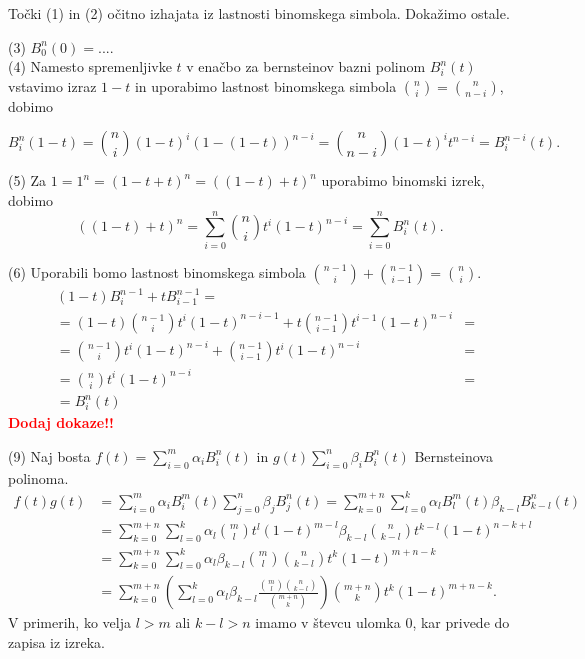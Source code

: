 \documentclass[isrm2, tisk]{fmfdelo}
\newcommand{\bernstein}[2]{\binom{#1}{#2}t^{#2}(1-t)^{#1-#2}}
\newcommand{\mycomment}[1]{\textbf{\textcolor{red}{#1}}}
\begin{document}
    \begin{dokaz}
        Točki (1) in (2) očitno izhajata iz lastnosti binomskega simbola.
        Dokažimo ostale.

        \noindent(3) $B_0^n(0) = ....$\\
        \noindent(4) Namesto spremenljivke $t$ v enačbo za bernsteinov bazni polinom $B_i^n(t)$ vstavimo izraz $1-t$ in uporabimo lastnost binomskega simbola $\binom{n}{i} = \binom{n}{n-i}$, dobimo

        \[B_i^n(1-t) = \binom{n}{i}(1-t)^i(1-(1-t))^{n-i} =  \binom{n}{n-i}(1-t)^it^{n-i} = B^{n-i}_{i}(t).\]

        \noindent(5) Za $1 = 1^n = (1-t+t)^n = ((1-t) + t)^n$ uporabimo binomski izrek, dobimo
        \[\left((1-t) + t\right)^n = \sum_{i=0}^{n}\bernstein{n}{i} = \sum_{i=0}^n B_i^n(t).\]

        \noindent(6) Uporabili bomo lastnost binomskega simbola $ \binom{n-1}{i} + \binom{n-1}{i-1} = \binom{n}{i}.$
        \begin{align}
            &(1-t)B_i^{n-1} + tB_{i-1}^{n-1} = \nonumber \\
            &= (1-t)\binom{n-1}{i}t^{i}(1-t)^{n-i-1} + t\binom{n-1}{i-1}t^{i-1}(1-t)^{n-i} &= \nonumber \\
            &= \binom{n-1}{i}t^{i}(1-t)^{n-i} + \binom{n-1}{i-1}t^{i}(1-t)^{n-i} &= \nonumber \\
            &= \binom{n}{i}t^{i}(1-t)^{n-i} &= \nonumber \\
            &= B_i^n(t)
        \end{align}
        \noindent \mycomment{Dodaj dokaze!!}

        \noindent(9) Naj bosta $f(t)=\sum_{i=0}^{m}\alpha_iB_i^n(t)$ in $g(t)\sum_{i=0}^{n}\beta_iB_i^n(t)$ Bernsteinova polinoma.
        \begin{align*}
            f(t)g(t) &=\sum_{i=0}^{m}\alpha_iB_{i}^{m}(t)\sum_{j=0}^{n}\beta_jB_{j}^{n}(t) = \sum_{k=0}^{m+n}\sum_{l=0}^k \alpha_lB_{l}^{m}(t)\beta_{k-l}B_{k-l}^{n}(t) \\
            &= \sum_{k=0}^{m+n}\sum_{l=0}^k \alpha_l \binom{m}{l}t^{l}(1-t)^{m-l} \beta_{k-l} \binom{n}{k-l}t^{k-l}(1-t)^{n-k+l} \\
            &= \sum_{k=0}^{m+n}\sum_{l=0}^k \alpha_l \beta_{k-l} \binom{m}{l}\binom{n}{k-l}t^{k}(1-t)^{m+n-k} \\
            &= \sum_{k=0}^{m+n} \left(\sum_{l=0}^k  \alpha_l \beta_{k-l}\frac{\binom{m}{l}\binom{n}{k-l}}{\binom{m+n}{k}}\right) \binom{m+n}{k} t^{k}(1-t)^{m+n-k}.
        \end{align*}
        V primerih, ko velja $l>m$ ali $k-l>n$ imamo v števcu ulomka $0$, kar privede do zapisa iz izreka.
    \end{dokaz}
\end{document}
